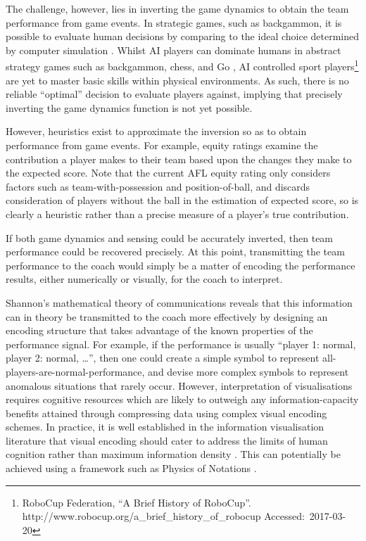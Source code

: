
The challenge, however, lies in inverting the game dynamics to obtain
the team performance from game events. In strategic games, such as
backgammon, it is possible to evaluate human decisions by comparing to
the ideal choice determined by computer simulation
\cite{oshaughnessy_identification_2016}. Whilst AI players can
dominate humans in abstract strategy games such as backgammon, chess, and Go \cite{silver2016mastering}, AI controlled sport players\footnote{RoboCup
  Federation, ``A Brief History of RoboCup''.
  http://www.robocup.org/a\_brief\_history\_of\_robocup
  Accessed:~2017-03-20} are yet to master basic skills within physical
environments. As such, there is no reliable ``optimal'' decision to
evaluate players against, implying that precisely inverting the game
dynamics function is not yet possible.

However, heuristics exist to approximate the inversion so as to obtain
performance from game events. For example, \afl{}
equity ratings \cite{Jackson2016} examine the contribution a player makes to their
team based upon the changes they make to the expected score. Note that
the current AFL equity rating only considers factors such as
team-with-possession and position-of-ball, and discards consideration of
players without the ball in the estimation of expected score, so is
clearly a heuristic rather than a precise measure of a player's true
contribution.

If both game dynamics and sensing could be accurately inverted, then team
performance could be recovered precisely. At this point, transmitting the
team performance to the coach would simply be a matter of encoding the
performance results, either numerically or visually, for the coach to
interpret.

Shannon's mathematical theory of communications
\cite{Shannon1948} reveals that this information can in
theory be transmitted to the coach more effectively by designing an
encoding structure that takes advantage of the known properties of the
performance signal. For example, if the performance is usually ``player
1: normal, player 2: normal, \ldots{}'', then one could create a simple
symbol to represent all-players-are-normal-performance, and devise more
complex symbols to represent anomalous situations that rarely occur.
However, interpretation of visualisations requires cognitive resources which are likely to outweigh
any information-capacity benefits attained through compressing data
using complex visual encoding schemes. In practice, it is well
established in the information visualisation literature that visual
encoding should cater to address the limits of human cognition rather
than maximum information density \cite{Anderson2011, Huang2009}. This can potentially be achieved using a framework such as Physics of Notations
\cite{Moody2009}.

